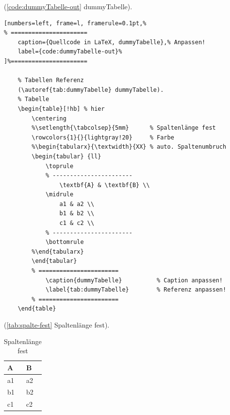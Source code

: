 (\autoref{code:dummyTabelle-out} dummyTabelle).
\lstset{language=[LaTeX]TeX} %
\begin{lstlisting}[numbers=left, frame=l, framerule=0.1pt,%
% ======================
	caption={Quellcode in LaTeX, dummyTabelle},% Anpassen!
	label={code:dummyTabelle-out}%
]%======================

	% Tabellen Referenz
	(\autoref{tab:dummyTabelle} dummyTabelle).
	% Tabelle
	\begin{table}[!hb] % hier
		\centering
		%\setlength{\tabcolsep}{5mm}      % Spaltenlänge fest
		\rowcolors{1}{}{lightgray!20}     % Farbe
		%\begin{tabularx}{\textwidth}{XX} % auto. Spaltenumbruch
		\begin{tabular} {ll}
			\toprule
			% -----------------------
				\textbf{A} & \textbf{B} \\
			\midrule
				a1 & a2 \\
				b1 & b2 \\
				c1 & c2 \\
			% -----------------------
			\bottomrule
		%\end{tabularx}
		\end{tabular}
		% =======================
			\caption{dummyTabelle}          % Caption anpassen!
			\label{tab:dummyTabelle}        % Referenz anpassen!
		% =======================
	\end{table}
\end{lstlisting}

(\autoref{tab:spalte-fest} Spaltenlänge fest).
\begin{table}[!hb] %
	\centering
	\setlength{\tabcolsep}{5mm}       %
	\begin{tabular} {ll}
		\toprule
	    \textbf{A} & \textbf{B} \\
	  \midrule
			a1 & a2 \\
			b1 & b2 \\
			c1 & c2 \\
		\bottomrule
	\end{tabular}
		\caption{Spaltenlänge fest}     %
		\label{tab:spalte-fest}		      %
\end{table}

